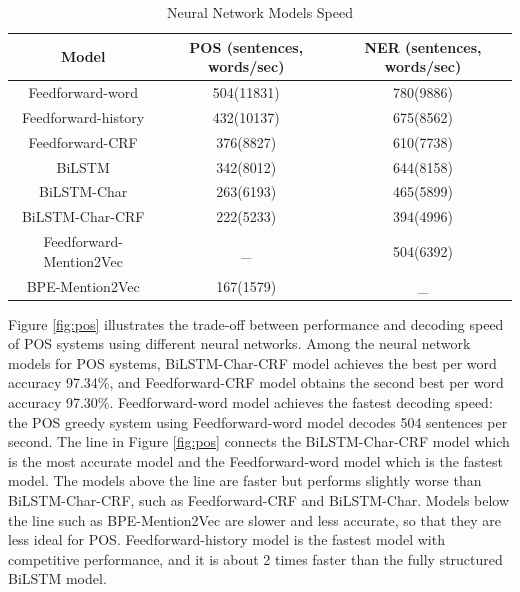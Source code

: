 \documentclass{sfuthesis}
\begin{document}
\begin{table}[]
\centering
\caption{Neural Network Models Speed}
\label{table:my-label2}
\begin{tabular}{|c|c|c|}
\hline
Model       & POS  (sentences, words/sec)  & NER  (sentences, words/sec)      \\ \hline
Feedforward-word    & 504(11831)     & 780(9886)    \\ \hline
Feedforward-history & 432(10137)     & 675(8562)     \\ \hline
Feedforward-CRF     & 376(8827)     & 610(7738)     \\ \hline
BiLSTM             & 342(8012)     & 644(8158)       \\ \hline
BiLSTM-Char        & 263(6193)  & 465(5899)             \\ \hline
BiLSTM-Char-CRF    & 222(5233)  & 394(4996)         \\ \hline
Feedforward-Mention2Vec         & _      & 504(6392)              \\ \hline
BPE-Mention2Vec     & 167(1579)  &  _               \\ \hline   
\end{tabular}
\end{table}

Figure \ref{fig:pos} illustrates the trade-off between performance and decoding speed of POS systems using different neural networks. Among the neural network models for POS systems, BiLSTM-Char-CRF model achieves the best per word accuracy 97.34\%, and Feedforward-CRF model obtains the second best per word accuracy 97.30\%. Feedforward-word model achieves the fastest decoding speed: the POS greedy system using Feedforward-word model decodes 504 sentences per second. The line in Figure \ref{fig:pos} connects the BiLSTM-Char-CRF model which is the most accurate model and the Feedforward-word model which is the fastest model. The models above the line are faster but performs slightly worse than BiLSTM-Char-CRF, such as Feedforward-CRF and BiLSTM-Char. Models below the line such as BPE-Mention2Vec are slower and less accurate, so that they are less ideal for POS. Feedforward-history model is the fastest model with competitive performance, and it is about 2 times faster than the fully structured BiLSTM model.
\end{document}
